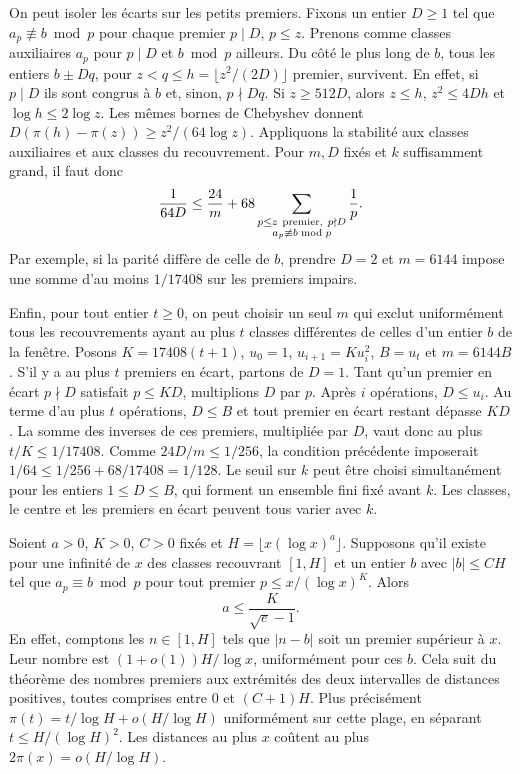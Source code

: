 \documentclass[11pt,a4paper]{article}
\begin{document}
On peut isoler les écarts sur les petits premiers. Fixons un entier
$D\ge1$ tel que $a_p\not\equiv b\bmod p$ pour chaque premier $p\mid D$,
$p\le z$. Prenons comme classes auxiliaires $a_p$ pour $p\mid D$ et
$b\bmod p$ ailleurs. Du côté le plus long de $b$, tous les entiers
$b\pm Dq$, pour $z<q\le h=\lfloor z^2/(2D)\rfloor$ premier, survivent.
En effet, si $p\mid D$ ils sont congrus à $b$ et, sinon, $p\nmid Dq$.
Si $z\ge512D$, alors $z\le h$, $z^2\le4Dh$ et $\log h\le2\log z$.
Les mêmes bornes de Chebyshev donnent
$D(\pi(h)-\pi(z))\ge z^2/(64\log z)$. Appliquons la stabilité aux
classes auxiliaires et aux classes du recouvrement. Pour $m,D$ fixés
et $k$ suffisamment grand, il faut donc
\[
 \frac1{64D}\le\frac{24}{m}
 +68\sum_{\substack{p\le z\ {\rm premier},\ p\nmid D\\
                       a_p\not\equiv b\bmod p}}\frac1p .
\]
Par exemple, si la parité diffère de celle de $b$, prendre $D=2$ et
$m=6144$ impose une somme d'au moins $1/17408$ sur les premiers impairs.

Enfin, pour tout entier $t\ge0$, on peut choisir un seul $m$
qui exclut uniformément tous les recouvrements ayant au plus $t$
classes différentes de celles d'un entier $b$ de la fenêtre.
Posons $K=17408(t+1)$, $u_0=1$, $u_{i+1}=K u_i^2$,
$B=u_t$ et $m=6144B$. S'il y a au plus $t$ premiers en écart,
partons de $D=1$. Tant qu'un premier en écart $p\nmid D$ satisfait
$p\le KD$, multiplions $D$ par $p$. Après $i$ opérations, $D\le u_i$.
Au terme d'au plus $t$ opérations, $D\le B$ et tout premier en écart
restant dépasse $KD$. La somme des inverses de ces premiers,
multipliée par $D$, vaut donc au plus $t/K\le1/17408$.
Comme $24D/m\le1/256$, la condition précédente imposerait
$1/64\le1/256+68/17408=1/128$. Le seuil sur $k$ peut être choisi
simultanément pour les entiers $1\le D\le B$, qui forment un ensemble
fini fixé avant $k$. Les classes, le centre et les premiers en écart
peuvent tous varier avec $k$.

Soient $a>0$, $K>0$, $C>0$ fixés et
$H=\lfloor x(\log x)^a\rfloor$. Supposons qu'il existe pour une
infinité de $x$ des classes recouvrant $[1,H]$ et un entier $b$ avec
$|b|\le CH$ tel que $a_p\equiv b\bmod p$ pour tout premier
$p\le x/(\log x)^K$. Alors
\[
                 a\le \frac{K}{\sqrt e-1}.
\]
En effet, comptons les $n\in[1,H]$ tels que $|n-b|$ soit un premier
supérieur à $x$. Leur nombre est $(1+o(1))H/\log x$, uniformément pour
ces $b$. Cela suit du théorème des nombres premiers aux extrémités
des deux intervalles de distances positives, toutes comprises entre
$0$ et $(C+1)H$. Plus précisément $\pi(t)=t/\log H+o(H/\log H)$
uniformément sur cette plage, en séparant $t\le H/(\log H)^2$.
Les distances au plus $x$ coûtent au plus $2\pi(x)=o(H/\log H)$.
\end{document}
